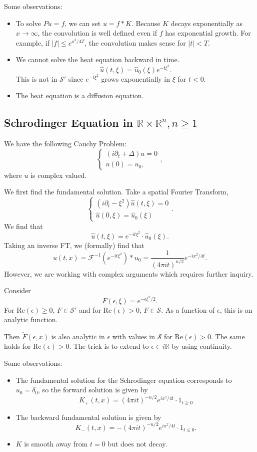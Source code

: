 \documentclass[11pt]{scrartcl}
\newcommand{\R}{\mathbb{R}}
\renewcommand{\hat}{\widehat}
\begin{document}
Some observations:
\begin{itemize}
\item To solve $Pu = f$, we can set $u = f * K$.  Because $K$ decays exponentially as $x \to \infty$, the convolution is well defined even if $f$ has exponential growth.  For example, if $|f| \le e^{x^2/4T}$, the convolution makes sense for $|t| < T$.
\item We cannot solve the heat equation backward in time.
$$\hat{u}(t, \xi) = \hat{u}_0(\xi) e^{-t\xi^2}.$$
This is not in $\mathcal S'$ since $e^{-t\xi^2}$ grows exponentially in $\xi$ for $t < 0$.
\item The heat equation is a diffusion equation.
\end{itemize}

\subsection{Schrodinger Equation in $\R \times \R^n, n \ge 1$}
We have the following Cauchy Problem:
$$\begin{cases}
(i \partial_t + \Delta) u = 0 \\
u(0) = u_0,
\end{cases},$$
where $u$ is complex valued.  

We first find the fundamental solution.  Take a spatial Fourier Transform,
$$\begin{cases}
(i\partial_t - \xi^2)\hat{u}(t, \xi) = 0 \\
\hat{u}(0, \xi) = \hat{u}_0(\xi)
\end{cases}.$$
We find that $$\hat{u}(t, \xi) = e^{-it\xi^2} \cdot \hat{u}_0(\xi).$$
Taking an inverse FT, we (formally) find that 
$$u(t, x) = \mathcal F^{-1}(e^{-it\xi^2}) * u_0 = \frac{1}{(4 \pi i t)^{n/2}} e^{-ix^2/4t}.$$
However, we are working with complex arguments which requires further inquiry.  

Consider 
$$F(\epsilon,\xi) = e^{-\epsilon \xi^2/2}.$$
For $\text{Re}(\epsilon) \ge 0$, $F \in \mathcal S'$ and for $\text{Re}(\epsilon) > 0$, $F \in \mathcal S$.  As a function of $\epsilon$, this is an analytic function.

Then $\check{F}(\epsilon, x)$ is also analytic in $\epsilon$ with values in $\mathcal S$ for $\text{Re}(\epsilon) > 0$.  The same holds for $\text{Re}(\epsilon) > 0$.  
The trick is to extend to $\epsilon \in i\R$ by using continuity.

Some observations:
\begin{itemize}
\item The fundamental solution for the Schrodinger equation corresponds to $u_0 = \delta_0$, so the forward solution is given by $$K_+(t, x) = (4 \pi i t)^{-n/2} e^{ix^2/4t} \cdot 1_{t \ge 0}$$
\item The backward fundamental solution is given by 
$$K_-(t, x) = -(4 \pi i t)^{-n/2} e^{ix^2/4t} \cdot 1_{t \le 0}.$$
\item $K$ is smooth away from $t=0$ but does not decay.
\end{itemize}
\pagebreak
\end{document}
